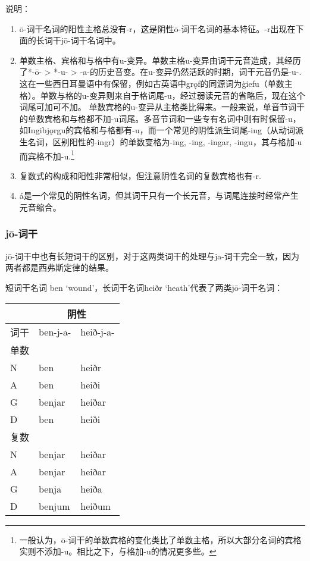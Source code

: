 说明：

\begin{enumerate}

  \item
        ō-词干名词的阳性主格总没有-r，这是阴性ō-词干名词的基本特征。-r出现在下面的长词干jō-词干名词中。
  \item
        单数主格、宾格和与格中有u-变异。单数主格u-变异由词干元音造成，其经历了*-ō- > *-u- > -a-的历史音变。在u-变异仍然活跃的时期，词干元音仍是-u-. 这在一些西日耳曼语中有保留，例如古英语中grǫf的同源词为ġiefu（单数主格）。单数与格的u-变异则来自于格词尾-u，经过弱读元音的省略后，现在这个词尾可加可不加。
        单数宾格的u-变异从主格类比得来。一般来说，单音节词干的单数宾格和与格都不加-u词尾。多音节词和一些专有名词中则有时保留-u，如Ingibjǫrgu的宾格和与格都有-u，而一个常见的阴性派生词尾-ing（从动词派生名词，区别阳性的-ingr）的单数变格为-ing,
        -ing, -ingar, -ingu，其与格加-u而宾格不加-u.\footnote{一般认为，ō-词干的单数宾格的变化类比了单数主格，所以大部分名词的宾格实则不添加-u。相比之下，与格加-u的情况更多些。}
  \item
        复数式的构成和阳性非常相似，但注意阴性名词的复数宾格也有-r.
  \item
        á是一个常见的阴性名词，但其词干只有一个长元音，与词尾连接时经常产生元音缩合。
\end{enumerate}

\subsubsection{jō-词干}

jō-词干中也有长短词干的区别，对于这两类词干的处理与ja-词干完全一致，因为两者都是西弗斯定律的结果。

短词干名词 ben `wound'，长词干名词heiðr `heath'代表了两类jō-词干名词：

\begin{longtable}{lll}
  \toprule
     & \multicolumn{2}{c}{\textbf{阴性}}             \\
  \midrule
  \endhead
  \bottomrule
  \endfoot
  词干 & ben-j-a-                        & heið-j-a- \\
  单数 &                                 &           \\
  N  & ben                             & heiðr     \\
  A  & ben                             & heiði     \\
  G  & benjar                          & heiðar    \\
  D  & ben                             & heiði     \\
  复数 &                                 &           \\
  N  & benjar                          & heiðar    \\
  A  & benjar                          & heiðar    \\
  G  & benja                           & heiða     \\
  D  & benjum                          & heiðum    \\
\end{longtable}

